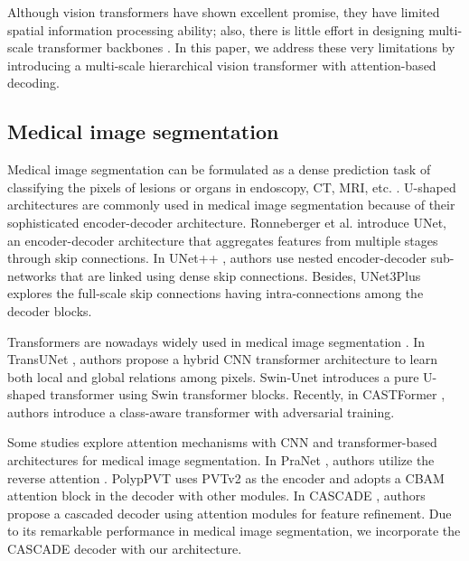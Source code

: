 \documentclass{midl}
\begin{document}
Although vision transformers have shown excellent promise, they have limited spatial information processing ability; also, there is little effort in designing multi-scale transformer backbones \cite{lin2022ds}. In this paper, we address these very limitations by introducing a multi-scale hierarchical vision transformer with attention-based decoding.










\subsection{Medical image segmentation}
Medical image segmentation can be formulated as a dense prediction task of classifying the pixels of lesions or organs in endoscopy, CT, MRI, etc. \cite{dong2021polyp, chen2021transunet}. U-shaped architectures \cite{ronneberger2015u, oktay2018attention, zhou2018unet++, huang2020unet, lou2021dc} are commonly used in medical image segmentation because of their sophisticated encoder-decoder architecture. Ronneberger et al. \cite{ronneberger2015u} introduce UNet, an encoder-decoder architecture that aggregates features from multiple stages through skip connections. In UNet++ \cite{zhou2018unet++}, authors use nested encoder-decoder sub-networks that are linked using dense skip connections. Besides, UNet3Plus \cite{huang2020unet} explores the full-scale skip connections having intra-connections among the decoder blocks.


Transformers are nowadays widely used in medical image segmentation \cite{cao2021swin, chen2021transunet, dong2021polyp}. In TransUNet \cite{chen2021transunet}, authors propose a hybrid CNN transformer architecture to learn both local and global relations among pixels. Swin-Unet \cite{cao2021swin} introduces a pure U-shaped transformer using Swin transformer \cite{liu2021swin} blocks. Recently, in CASTFormer \cite{you2022class}, authors introduce a class-aware transformer with adversarial training.

Some studies explore attention mechanisms with CNN \cite{oktay2018attention, fan2020pranet} and transformer-based architectures \cite{dong2021polyp} for medical image segmentation. In PraNet \cite{fan2020pranet}, authors utilize the reverse attention \cite{chen2018reverse}. PolypPVT \cite{dong2021polyp} uses PVTv2 \cite{wang2022pvt} as the encoder and adopts a CBAM \cite{woo2018cbam} attention block in the decoder with other modules. In CASCADE \cite{rahman2023medical}, authors propose a cascaded decoder using attention modules for feature refinement. Due to its remarkable performance in medical image segmentation, we incorporate the CASCADE decoder with our architecture.
\end{document}

